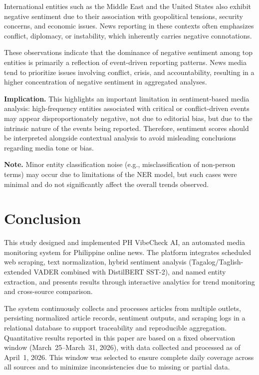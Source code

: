 \documentclass[sigconf, nonacm]{acmart}
\begin{document}
International entities such as the Middle East and the United States also exhibit negative sentiment due to their association with geopolitical tensions, security concerns, and economic issues. News reporting in these contexts often emphasizes conflict, diplomacy, or instability, which inherently carries negative connotations.

These observations indicate that the dominance of negative sentiment among top entities is primarily a reflection of event-driven reporting patterns. News media tend to prioritize issues involving conflict, crisis, and accountability, resulting in a higher concentration of negative sentiment in aggregated analyses.

\textbf{Implication.}
This highlights an important limitation in sentiment-based media analysis: high-frequency entities associated with critical or conflict-driven events may appear disproportionately negative, not due to editorial bias, but due to the intrinsic nature of the events being reported. Therefore, sentiment scores should be interpreted alongside contextual analysis to avoid misleading conclusions regarding media tone or bias.

\textbf{Note.}
Minor entity classification noise (e.g., misclassification of non-person terms) may occur due to limitations of the NER model, but such cases were minimal and do not significantly affect the overall trends observed.

\section{Conclusion}
This study designed and implemented PH VibeCheck AI, an automated media monitoring system for Philippine online news. The platform integrates scheduled web scraping, text normalization, hybrid sentiment analysis (Tagalog/Taglish-extended VADER combined with DistilBERT SST-2), and named entity extraction, and presents results through interactive analytics for trend monitoring and cross-source comparison.

The system continuously collects and processes articles from multiple outlets, persisting normalized article records, sentiment outputs, and scraping logs in a relational database to support traceability and reproducible aggregation. Quantitative results reported in this paper are based on a fixed observation window (March~25--March~31, 2026), with data collected and processed as of April~1, 2026. This window was selected to ensure complete daily coverage across all sources and to minimize inconsistencies due to missing or partial data.
\end{document}
